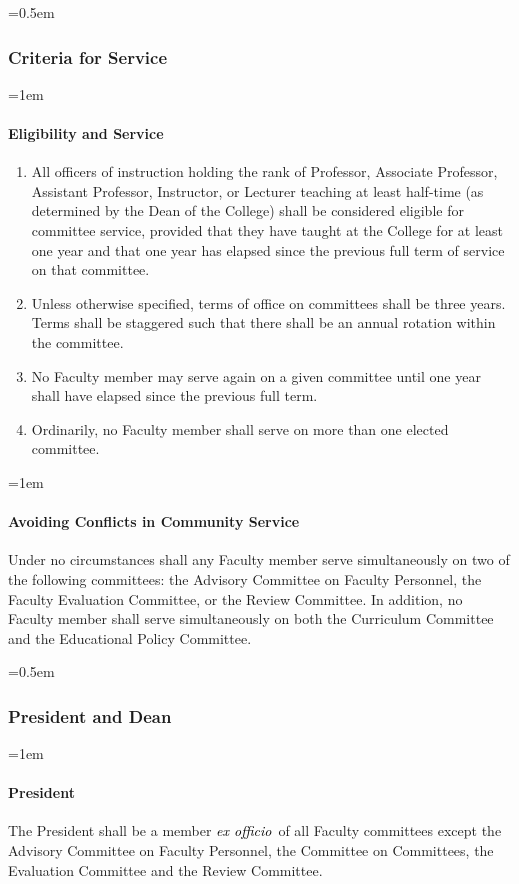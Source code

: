 \documentclass{manual}
\newcommand{\keyword}[1]{\textcolor{black}{#1}}
\newcommand{\exoff}{\keyword{\textit{ex officio}}~}
\let\oldsubsubsection\subsubsection
\renewcommand\subsubsection{\leftskip=0.5em\oldsubsubsection}
\let\oldparagraph\paragraph
\renewcommand\paragraph{\leftskip=1em\oldparagraph}
\newcommand{\itemLevelA}{\alph*.}
\newcommand{\itemRefA}{\alph*}
\begin{document}
		\subsubsection{Criteria for Service}

			\paragraph{Eligibility and Service}

				\begin{enumerate}[label=\itemLevelA,ref=\itemRefA]
				\item All officers of instruction holding the rank of Professor, Associate Professor, Assistant Professor, Instructor, or Lecturer teaching at least half-time (as determined by the Dean of the College) shall be considered eligible for committee service, provided that they have taught at the College for at least one year and that one year has elapsed since the previous full term of service on that committee.
				\item Unless otherwise specified, terms of office on committees shall be three years. Terms shall be staggered such that there shall be an annual rotation within the committee.
				\item No Faculty member may serve again on a given committee until one year shall have elapsed since the previous full term.
				\item Ordinarily, no Faculty member shall serve on more than one elected committee.
				\end{enumerate}

			\paragraph{Avoiding Conflicts in Community Service}
			Under no circumstances shall any Faculty member serve simultaneously on two of the following committees: the Advisory Committee on Faculty Personnel, the Faculty Evaluation Committee, or the Review Committee. In addition, no Faculty member shall serve simultaneously on both the Curriculum Committee and the Educational Policy Committee.

		\subsubsection{President and Dean}

			\paragraph{President}
			The President shall be a member \exoff of all Faculty committees except the Advisory Committee on Faculty Personnel, the Committee on Committees, the Evaluation Committee and the Review Committee.
\end{document}
